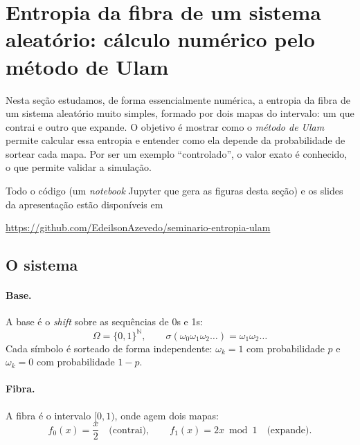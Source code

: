 %
%
\providecommand{\repoPelikan}{https://github.com/EdeilsonAzevedo/seminario-entropia-ulam}

\section{Entropia da fibra de um sistema aleatório: cálculo numérico pelo método de Ulam}
\label{sec:pelikan}

Nesta seção estudamos, de forma essencialmente numérica, a entropia da fibra de um
sistema aleatório muito simples, formado por dois mapas do intervalo: um que contrai e
outro que expande. O objetivo é mostrar como o \emph{método de Ulam} permite calcular essa
entropia e entender como ela depende da probabilidade de sortear cada mapa. Por ser um
exemplo ``controlado'', o valor exato é conhecido, o que permite validar a simulação.

Todo o código (um \emph{notebook} Jupyter que gera as figuras desta seção) e os slides da
apresentação estão disponíveis em
\begin{center}
  \url{\repoPelikan}
\end{center}

\subsection{O sistema}
\label{subsec:pelikan-sistema}

\paragraph{Base.} A base é o \emph{shift} sobre as sequências de 0s e 1s:
\[
  \Omega=\{0,1\}^{\mathbb N},\qquad
  \sigma(\omega_0\omega_1\omega_2\ldots)=\omega_1\omega_2\ldots
\]
Cada símbolo é sorteado de forma independente: $\omega_k=1$ com probabilidade $p$ e
$\omega_k=0$ com probabilidade $1-p$.

\paragraph{Fibra.} A fibra é o intervalo $[0,1)$, onde agem dois mapas:
\[
  f_0(x)=\frac{x}{2}\quad\text{(contrai)},\qquad
  f_1(x)=2x \bmod 1\quad\text{(expande)}.
\]

